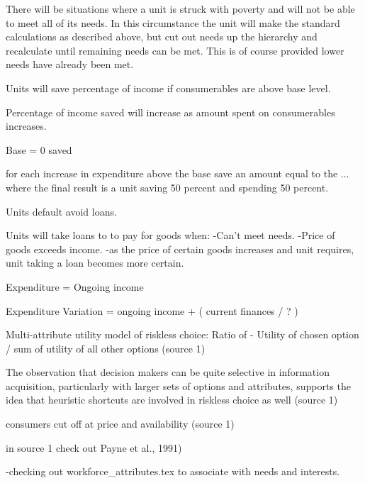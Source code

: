 

There will be situations where a unit is struck with poverty and will not be able to meet all of its needs. In this circumstance the unit will make the standard calculations as described above, but cut out needs up the hierarchy and recalculate until remaining needs can be met. This is of course provided lower needs have already been met.




Units will save percentage of income if consumerables are above base level.

Percentage of income saved will increase as amount spent on consumerables increases.


Base = 0 saved

for each increase in expenditure above the base save an amount equal to the ... where the final result is a unit saving 50 percent and spending 50 percent.



Units default avoid loans.

Units will take loans to to pay for goods when:
-Can't meet needs.
-Price of goods exceeds income.
	-as the price of certain goods increases and unit requires, unit taking a loan becomes more certain. 





 

Expenditure = Ongoing income 

Expenditure Variation = ongoing income + ( current finances / ? )

Multi-attribute utility model of riskless choice:
Ratio of - Utility of chosen option / sum of utility of all other options (source 1)

The observation that decision makers can be quite selective in information acquisition, particularly with larger sets of options and attributes, supports the idea that heuristic shortcuts are involved in riskless choice as well (source 1)

consumers cut off at price and availability (source 1)

in source 1 check out Payne et al., 1991)


-checking out workforce_attributes.tex to associate with needs and interests.




